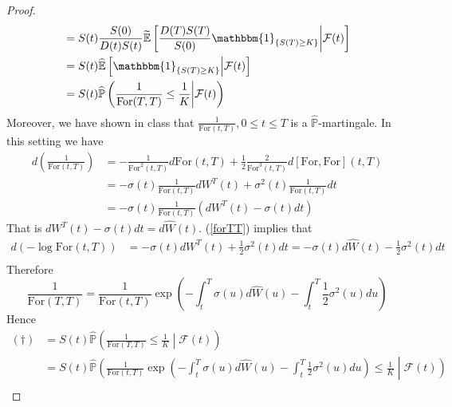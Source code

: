 \documentclass[a4paper, 10pt]{article}
\theoremstyle{definition}
\theoremstyle{hSol}
\begin{document}
\begin{proof}
\begin{equation}
\begin{split}
    &=S(t)\frac{S(0)}{D(t)S(t)} \widetilde{\mathbb{E}}\left[\frac{D(T)S(T)}{S(0)} \mathbbm{1}_{\{S(T)\geq K\}}\middle|\mathcal{F}(t)\right]\\
    &=S(t) \widehat{\mathbb{E}}\left[ \mathbbm{1}_{\{S(T)\geq K\}}\middle|\mathcal{F}(t)\right]\\
    &=S(t) \widehat{\mathbb{P}}\left(\frac{1}{\text{For}(T,T)}\leq \frac{1}{K}\middle|\mathcal{F}(t)\right)\\
  \end{split}
\end{equation}
Moreover, we have shown in class that $\frac{1}{\text{For}(t,T)}, 0\leq t\leq T$ is a $\widehat{\mathbb{P}}$-martingale. In this setting we have
\begin{equation}
  \begin{split}
    d\left(\frac{1}{\text{For}(t,T)}\right) &= -\frac{1}{\text{For}^2(t,T)} d\text{For}(t,T)+ \frac{1}{2}\frac{2}{\text{For}^3(t,T)}d[\text{For},\text{For}](t,T)\\
    &=-\sigma(t)\frac{1}{\text{For}(t,T)} dW^T(t) + \sigma^2(t)\frac{1}{\text{For}(t,T)} dt\\
    &=-\sigma(t)\frac{1}{\text{For}(t,T)} \left(dW^T(t) - \sigma(t)dt\right)
  \end{split}
\end{equation}
That is $dW^T(t) - \sigma(t)dt =  d\widehat{W}(t)$. (\ref{forTT}) implies that
\begin{equation}
  \begin{split}
    d(-\log \text{For}(t,T)) 
    &=-\sigma(t)dW^T(t) + \frac{1}{2}\sigma^2(t)dt=-\sigma(t)d\widehat{W}(t) - \frac{1}{2}\sigma^2(t)dt\\
  \end{split}
\end{equation}
Therefore
\begin{equation}
  \frac{1}{\text{For}(T,T)} = \frac{1}{\text{For}(t,T)}\exp\left(-\int_t^T \sigma(u)d\widehat{W}(u) - \int_t^T \frac{1}{2}\sigma^2(u)du\right)
\end{equation}
Hence
\begin{equation}
  \begin{split}
    (\dag) &=S(t) \widehat{\mathbb{P}}\left(\frac{1}{\text{For}(T,T)}\leq \frac{1}{K}\middle|\mathcal{F}(t)\right) \\
    &= S(t) \widehat{\mathbb{P}}\left(\frac{1}{\text{For}(t,T)}\exp\left(-\int_t^T \sigma(u)d\widehat{W}(u) - \int_t^T \frac{1}{2}\sigma^2(u)du\right)\leq \frac{1}{K}\middle|\mathcal{F}(t)\right) \\

\end{split}
\end{equation}
\end{proof}
\end{document}
